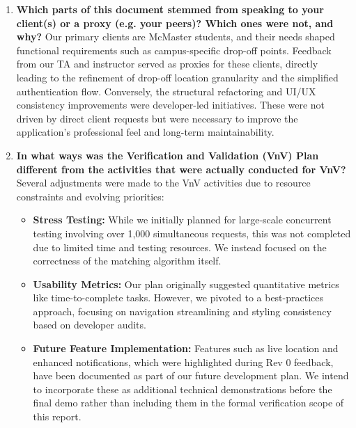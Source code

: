 \begin{enumerate}
  \item \textbf{Which parts of this document stemmed from speaking to your client(s) or a proxy (e.g. your peers)? Which ones were not, and why?}
  Our primary clients are McMaster students, and their needs shaped functional requirements such as campus-specific drop-off points. Feedback from our TA and instructor served as proxies for these clients, directly leading to the refinement of drop-off location granularity and the simplified authentication flow. Conversely, the structural refactoring and UI/UX consistency improvements were developer-led initiatives. These were not driven by direct client requests but were necessary to improve the application's professional feel and long-term maintainability.

  \item \textbf{In what ways was the Verification and Validation (VnV) Plan different from the activities that were actually conducted for VnV?}
  Several adjustments were made to the VnV activities due to resource constraints and evolving priorities:
  \begin{itemize}
      \item \textbf{Stress Testing:} While we initially planned for large-scale concurrent testing involving over 1,000 simultaneous requests, this was not completed due to limited time and testing resources. We instead focused on the correctness of the matching algorithm itself.
      \item \textbf{Usability Metrics:} Our plan originally suggested quantitative metrics like time-to-complete tasks. However, we pivoted to a best-practices approach, focusing on navigation streamlining and styling consistency based on developer audits.
      \item \textbf{Future Feature Implementation:} Features such as live location and enhanced notifications, which were highlighted during Rev 0 feedback, have been documented as part of our future development plan. We intend to incorporate these as additional technical demonstrations before the final demo rather than including them in the formal verification scope of this report.
  \end{itemize}
\end{enumerate}